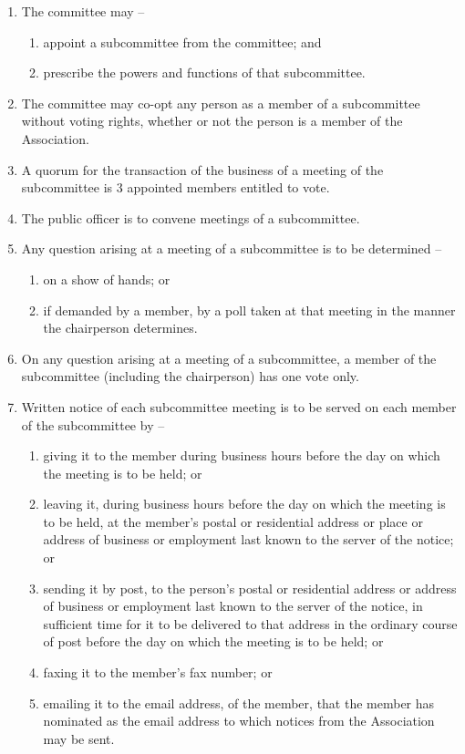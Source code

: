 \documentclass[a4paper,11pt]{article}
\begin{document}
\begin{enumerate}
	\item The committee may --
	\begin{enumerate}
		\item appoint a subcommittee from the committee; and
		\item prescribe the powers and functions of that subcommittee.
	\end{enumerate}
	
	\item The committee may co-opt any person as a member of a subcommittee without voting rights, whether or not the person is a member of the Association.
	\item A quorum for the transaction of the business of a meeting of the subcommittee is 3 appointed members entitled to vote.
	\item The public officer is to convene meetings of a subcommittee.
	
	\item Any question arising at a meeting of a subcommittee is to be determined --
	\begin{enumerate}
		\item on a show of hands; or
		\item if demanded by a member, by a poll taken at that meeting in the manner the chairperson determines.
	\end{enumerate}
	
	\item On any question arising at a meeting of a subcommittee, a member of the subcommittee (including the chairperson) has one vote only.
	
	\item Written notice of each subcommittee meeting is to be served on each member of the subcommittee by --
	\begin{enumerate}
		\item giving it to the member during business hours before the day on which the meeting is to be held; or
		\item leaving it, during business hours before the day on which the meeting is to be held, at the member's postal or residential address or place or address of business or employment last known to the server of the notice; or
		\item sending it by post, to the person's postal or residential address or address of business or employment last known to the server of the notice, in sufficient time for it to be delivered to that address in the ordinary course of post before the day on which the meeting is to be held; or
		\item faxing it to the member's fax number; or
		\item emailing it to the email address, of the member, that the member has nominated as the email address to which notices from the Association may be sent.
	\end{enumerate}
\end{enumerate}
\end{document}
